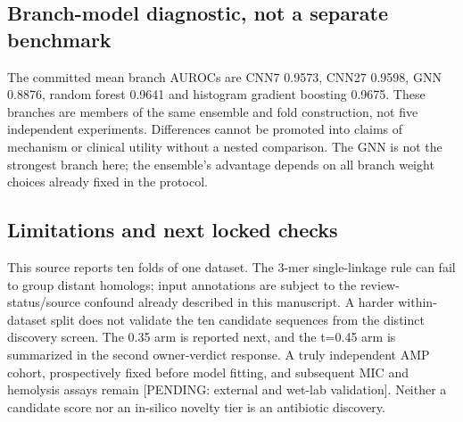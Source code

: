 \subsection*{Branch-model diagnostic, not a separate benchmark}
The committed mean branch AUROCs are CNN7 0.9573, CNN27 0.9598, GNN 0.8876, random forest 0.9641 and histogram gradient boosting 0.9675. These branches are members of the same ensemble and fold construction, not five independent experiments. Differences cannot be promoted into claims of mechanism or clinical utility without a nested comparison. The GNN is not the strongest branch here; the ensemble's advantage depends on all branch weight choices already fixed in the protocol.
\subsection*{Limitations and next locked checks}
This source reports ten folds of one dataset. The 3-mer single-linkage rule can fail to group distant homologs; input annotations are subject to the review-status/source confound already described in this manuscript. A harder within-dataset split does not validate the ten candidate sequences from the distinct discovery screen. The 0.35 arm is reported next, and the t=0.45 arm is summarized in the second owner-verdict response. A truly independent AMP cohort, prospectively fixed before model fitting, and subsequent MIC and hemolysis assays remain [PENDING: external and wet-lab validation]. Neither a candidate score nor an in-silico novelty tier is an antibiotic discovery.
